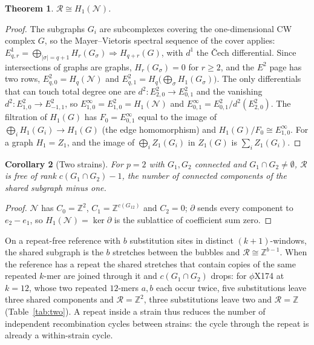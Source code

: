 \documentclass[11pt]{article}
\theoremstyle{plain}
\newtheorem{theorem}{Theorem}
\newtheorem{corollary}[theorem]{Corollary}
\theoremstyle{definition}
\theoremstyle{remark}
\newcommand{\Z}{\mathbb{Z}}
\newcommand{\Rec}{\mathcal{R}}
\newcommand{\Nerve}{\mathcal{N}}
\begin{document}
\begin{theorem}\label{thm:mv}
$\Rec\cong H_1(\Nerve)$.
\end{theorem}

\begin{proof}
The subgraphs $G_i$ are subcomplexes covering the one-dimensional CW complex $G$, so the
Mayer--Vietoris spectral sequence of the cover \cite[VII.4]{Brown} applies:
$E^1_{q,r}=\bigoplus_{|\sigma|=q+1}H_r(G_\sigma)\Rightarrow H_{q+r}(G)$, with $d^1$ the
\v Cech differential. Since intersections of graphs are graphs, $H_r(G_\sigma)=0$ for
$r\ge2$, and the $E^2$ page has two rows, $E^2_{q,0}=H_q(\Nerve)$ and
$E^2_{q,1}=H_q\big(\bigoplus_\sigma H_1(G_\sigma)\big)$. The only differentials that can
touch total degree one are $d^2\colon E^2_{2,0}\to E^2_{0,1}$ and the vanishing
$d^2\colon E^2_{1,0}\to E^2_{-1,1}$, so $E^\infty_{1,0}=E^2_{1,0}=H_1(\Nerve)$ and
$E^\infty_{0,1}=E^2_{0,1}/d^2(E^2_{2,0})$. The filtration of $H_1(G)$ has $F_0=E^\infty_{0,1}$
equal to the image of $\bigoplus_iH_1(G_i)\to H_1(G)$ (the edge homomorphism) and
$H_1(G)/F_0\cong E^\infty_{1,0}$. For a graph $H_1=Z_1$, and the image of
$\bigoplus_iZ_1(G_i)$ in $Z_1(G)$ is $\sum_iZ_1(G_i)$.
\end{proof}

\begin{corollary}[Two strains]\label{cor:two}
For $p=2$ with $G_1,G_2$ connected and $G_1\cap G_2\ne\emptyset$, $\Rec$ is free of rank
$c(G_1\cap G_2)-1$, the number of connected components of the shared subgraph minus one.
\end{corollary}

\begin{proof}
$\Nerve$ has $C_0=\Z^2$, $C_1=\Z^{c(G_{12})}$ and $C_2=0$; $\partial$ sends every component to
$e_2-e_1$, so $H_1(\Nerve)=\ker\partial$ is the sublattice of coefficient sum zero.
\end{proof}

On a repeat-free reference with $b$ substitution sites in distinct $(k{+}1)$-windows, the
shared subgraph is the $b$ stretches between the bubbles and $\Rec\cong\Z^{b-1}$. When the
reference has a repeat the shared stretches that contain copies of the same repeated $k$-mer
are joined through it and $c(G_1\cap G_2)$ drops: for $\phi$X174 at $k=12$, whose two
repeated $12$-mers $a,b$ each occur twice, five substitutions leave three shared components and
$\Rec=\Z^2$, three substitutions leave two and $\Rec=\Z$ (Table~\ref{tab:two}). A repeat
inside a strain thus reduces the number of independent recombination cycles between strains:
the cycle through the repeat is already a within-strain cycle.
\end{document}
